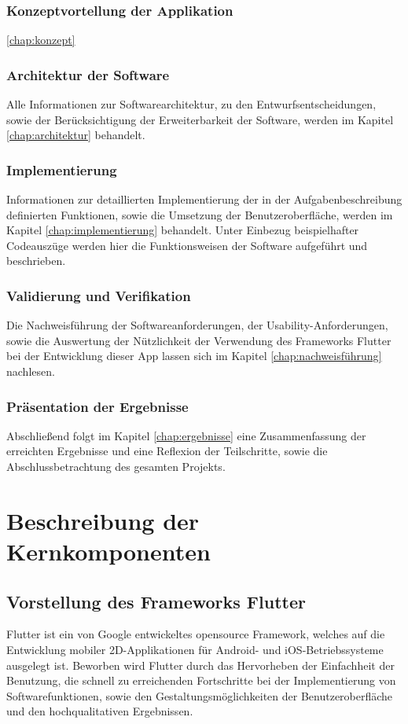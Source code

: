 \documentclass[bibliography=totoc,listof=totoc,BCOR=5mm,DIV=12,oneside]{scrbook}
\begin{document}
\subsection{Konzeptvortellung der Applikation}
\par \ref{chap:konzept}


\subsection{Architektur der Software}
\par Alle Informationen zur Softwarearchitektur, zu den Entwurfsentscheidungen, sowie der Berücksichtigung der Erweiterbarkeit der Software, werden im Kapitel \ref{chap:architektur}  behandelt.

\subsection{Implementierung}
Informationen zur detaillierten Implementierung der in der Aufgabenbeschreibung definierten Funktionen, sowie die Umsetzung der Benutzeroberfläche, werden im Kapitel \ref{chap:implementierung} behandelt. Unter Einbezug beispielhafter Codeauszüge werden hier die Funktionsweisen der Software aufgeführt und beschrieben.

\subsection{Validierung und Verifikation}
Die Nachweisführung der Softwareanforderungen, der Usability-Anforderungen, sowie die Auswertung der Nützlichkeit der Verwendung des Frameworks Flutter bei der Entwicklung dieser App lassen sich im Kapitel \ref{chap:nachweisführung} nachlesen.

\subsection{Präsentation der Ergebnisse}
Abschließend folgt im Kapitel \ref{chap:ergebnisse} eine Zusammenfassung der erreichten Ergebnisse und eine Reflexion der Teilschritte, sowie die Abschlussbetrachtung des gesamten Projekts.


\chapter{Beschreibung der Kernkomponenten} \label{chap:grundlagenkapitel}

\section{Vorstellung des Frameworks Flutter}
Flutter ist ein von Google entwickeltes opensource Framework, welches auf die Entwicklung mobiler 2D-Applikationen für Android- und iOS-Betriebssysteme ausgelegt ist. Beworben wird Flutter durch das Hervorheben der Einfachheit der Benutzung, die schnell zu erreichenden Fortschritte bei der Implementierung von Softwarefunktionen, sowie den Gestaltungsmöglichkeiten der Benutzeroberfläche und den hochqualitativen Ergebnissen.
\end{document}
